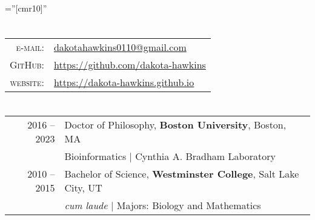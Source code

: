 \documentclass[a4paper,10pt]{report}
\begin{document}



\font\fb=''[cmr10]'' %

\par{
	\bigskip\par
}

\section{\color{linkcolour}{Contact}}

\begin{tabular}{rl}
	\textsc{e-mail:}  & \href{mailto:dakotahawkins0110@gmail.com}{dakotahawkins0110@gmail.com}      \\
	\textsc{GitHub:}  & \href{https://github.com/dakota-hawkins}{https://github.com/dakota-hawkins} \\
	\textsc{website:} & \href{https://dakota-hawkins.github.io}{https://dakota-hawkins.github.io}
\end{tabular}

\section{\color{linkcolour}{Education}}
\begin{tabular}{rl}
	\textsc{2016 -- 2023} & Doctor of Philosophy, \textbf{Boston University}, Boston, MA          \\
	                      & Bioinformatics | Cynthia A. Bradham Laboratory                        \\

	\textsc{2010 -- 2015} & Bachelor of Science, \textbf{Westminster College}, Salt Lake City, UT \\
	                      & \emph{cum laude} | Majors: Biology and Mathematics                    \\
\end{tabular}

\end{document}
